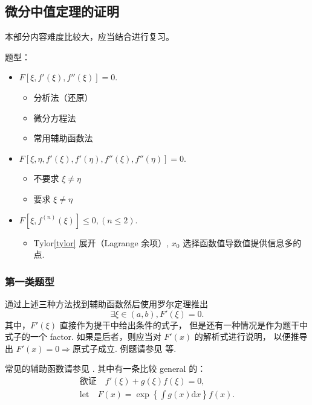 \subsection{微分中值定理的证明}

本部分内容难度比较大，应当结合\cite{we}进行复习。

题型：
\begin{itemize}
    \item $F\left[\xi, f'(\xi), f''(\xi)\right] = 0$.
        \begin{itemize}
            \item 分析法（还原）
            \item 微分方程法
            \item 常用辅助函数法
        \end{itemize}
    \item $F\left[\xi, \eta, f'(\xi), f'(\eta), f''(\xi), f''(\eta)\right] = 0$.
        \begin{itemize}
            \item 不要求 $\xi \neq \eta$
            \item 要求 $\xi \neq \eta$
        \end{itemize}
    \item $F\left[\xi, f^{(n)}(\xi)\right] \leq 0, (n \leq 2)$.
        \begin{itemize}
            \item Tylor\ref{tylor} 展开（Lagrange 余项）, 
                  $x_0$ 选择函数值导数值提供信息多的点.
        \end{itemize}
\end{itemize}

\subsubsection{第一类题型}

通过上述三种方法找到辅助函数然后使用罗尔定理推出
\[
    \exists \xi \in \left(a, b\right), F'(\xi) = 0.
\]
其中，$F'(\xi)$ 直接作为提干中给出条件的式子，
但是还有一种情况是作为题干中式子的一个 factor.
如果是后者，则应当对 $F'(x)$ 的解析式进行说明，
以便推导出 $F'(x) = 0 \Rightarrow \mbox{原式子成立}$.
例题请参见 \cite[page 82, pdf 93, example 2]{we} 等.

常见的辅助函数请参见 \cite[page 83, pdf 94]{we}.
其中有一条比较 general 的：
\begin{align*}
    \mbox{欲证}\quad f'(\xi) + g(\xi) f(\xi) = 0,  \\
    \mbox{let} \quad 
    F(x) = \exp \left\{\int g(x) \mbox{d}x\right\} f(x).
\end{align*}

